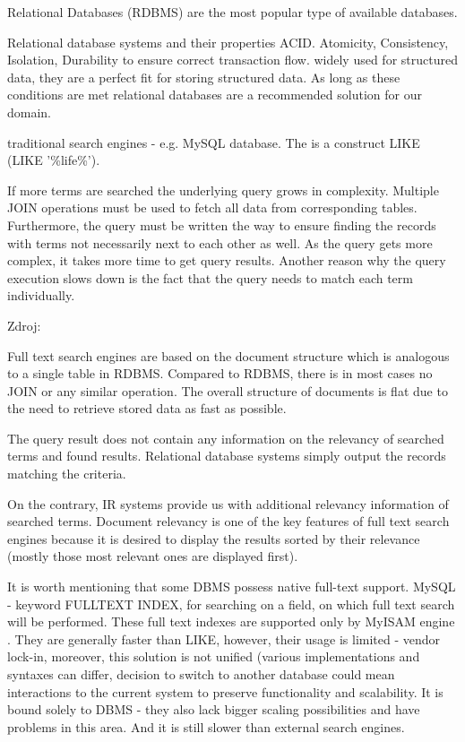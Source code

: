 Relational Databases (RDBMS) are the most popular type of available databases. 

Relational database systems and their properties ACID. 
Atomicity, Consistency, Isolation, Durability to ensure correct transaction flow. 
widely used for structured data, they are a perfect fit for storing structured data. 
As long as these conditions are met relational databases are a recommended solution for our domain.

traditional search engines - e.g. MySQL database. The is a construct
LIKE (LIKE '\%life\%').

If more terms are searched the underlying query grows in complexity.
Multiple JOIN operations must be used to fetch all data from corresponding tables.
Furthermore, the query must be written the way to ensure finding the records with terms not necessarily next to each other as well. 
As the query gets more complex, it takes more time to get query results.
Another reason why the query execution slows down is the fact that the query needs to match each term individually.

Zdroj: \cite{Solr3EnterpriseSS}

Full text search engines are based on the document structure which is analogous to a single table in RDBMS. 
Compared to RDBMS, there is in most cases no JOIN or any similar operation. 
The overall structure of documents is flat due to the need to retrieve stored data as fast as possible.

The query result does not contain any information on the relevancy of searched terms and found results. 
Relational database systems simply output the records matching the criteria.

On the contrary, IR systems provide us with additional relevancy information of searched terms. 
Document relevancy is one of the key features of full text search engines because it is desired to display the results sorted by their relevance (mostly those most relevant ones are displayed first).

It is worth mentioning that some DBMS possess native full-text support.
MySQL - keyword FULLTEXT INDEX, for searching on a field, on which full text search will be performed. 
These full text indexes are supported only by MyISAM engine \cite{MyISAM}. 
They are generally faster than LIKE, however, their usage is limited - vendor lock-in,
moreover, this solution is not unified (various implementations and syntaxes can differ, decision to switch to another database could mean interactions to the current system to preserve functionality and scalability. 
It is bound solely to DBMS - they also lack bigger scaling possibilities and have problems in this area. 
And it is still slower than external search engines.

